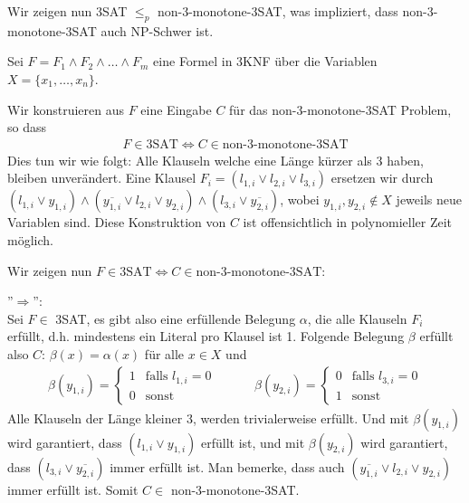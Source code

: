 \documentclass[a4paper,ngerman,12pt]{exam}
\newcommand\nmSAT{non-3-monotone-3SAT}
\begin{document}
\begin{questions}
\begin{parts}
{\begin{solution}
    Wir zeigen nun 3SAT $\leq_p$ \nmSAT, was impliziert, dass \nmSAT{} auch NP-Schwer ist.

    Sei $F = F_1 \wedge F_2 \wedge \dots \wedge F_m$ eine Formel in 3KNF über die
    Variablen $X = \{x_1, \dots, x_n\}$.

    Wir konstruieren aus $F$ eine Eingabe $C$ für das \nmSAT{} Problem, so dass
    \begin{align*}
        F \in \text{3SAT} \iff C \in \text{\nmSAT}
    \end{align*}
    Dies tun wir wie folgt: Alle Klauseln welche eine Länge kürzer als 3 haben,
    bleiben unverändert. Eine Klausel $F_i = (l_{1,i} \vee l_{2,i} \vee l_{3,i})$
    ersetzen wir durch
    $(l_{1,i} \vee y_{1,i}) \wedge
      (\overline{y_{1,i}} \vee l_{2,i} \vee y_{2,i}) \wedge (l_{3,i} \vee \overline{y_{2,i}})$,
    wobei $y_{1,i},y_{2,i} \not\in X$ jeweils neue Variablen sind.
    Diese Konstruktion von $C$ ist offensichtlich in polynomieller Zeit möglich.

    Wir zeigen nun $F \in \text{3SAT} \iff C \in \text{\nmSAT}$:

    ''$\Rightarrow$'': \\
        Sei $F \in$ 3SAT, es gibt also eine erfüllende Belegung $\alpha$, die
        alle Klauseln $F_i$ erfüllt, d.h. mindestens ein Literal pro Klausel
        ist 1. Folgende Belegung $\beta$ erfüllt also $C$:
        $\beta(x) = \alpha(x)$ für alle $x \in X$ und
        \begin{align*}
          \beta(y_{1,i}) = \begin{cases}
              1 & \text{falls } l_{1,i} = 0 \\
              0 & \text{sonst}
          \end{cases} \hspace{3em}
          \beta(y_{2,i}) = \begin{cases}
              0 & \text{falls } l_{3,i} = 0 \\
              1 & \text{sonst}
            \end{cases}
        \end{align*}
        Alle Klauseln der Länge kleiner 3, werden trivialerweise erfüllt.
        Und mit $\beta(y_{1,i})$ wird garantiert, dass $(l_{1,i} \vee y_{1,i})$ erfüllt ist,
        und mit $\beta(y_{2,i})$ wird garantiert, dass
        $(l_{3,i} \vee \overline{y_{2,i}})$ immer erfüllt ist.
        Man bemerke, dass auch
        $(\overline{y_{1,i}} \vee l_{2,i} \vee y_{2,i})$ immer erfüllt ist.
        Somit $C \in$ \nmSAT.


\end{solution}}
\end{parts}
\end{questions}
\end{document}

